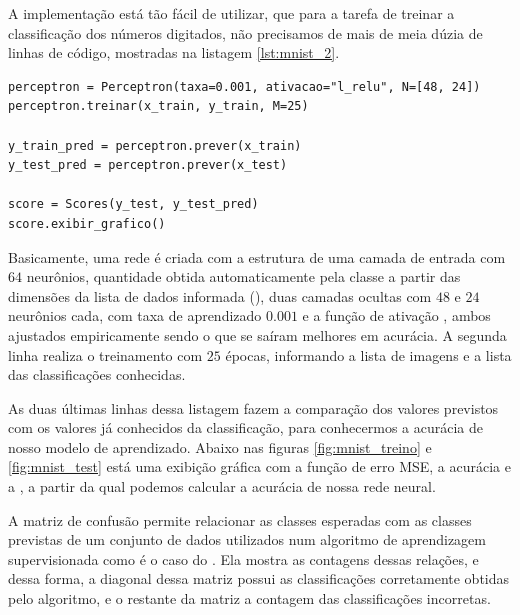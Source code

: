 A implementação está tão fácil de utilizar, que para a tarefa de treinar a classificação dos números digitados, não precisamos de mais de meia dúzia de linhas de código, mostradas na listagem \ref{lst:mnist_2}.

\begin{scriptsize}
\estiloR
\begin{lstlisting}[caption={Trecho do script \eng{mnist\_test.py}}, label={lst:mnist_2}, escapeinside={\%}]
perceptron = Perceptron(taxa=0.001, ativacao="l_relu", N=[48, 24])
perceptron.treinar(x_train, y_train, M=25)

y_train_pred = perceptron.prever(x_train)
y_test_pred = perceptron.prever(x_test)

score = Scores(y_test, y_test_pred)
score.exibir_grafico()
\end{lstlisting}
\end{scriptsize}

Basicamente, uma rede é criada com a estrutura de uma camada de entrada com $64$ neurônios, quantidade obtida automaticamente pela classe a partir das dimensões da lista de dados informada (), duas camadas ocultas com $48$ e $24$ neurônios cada, com taxa de aprendizado $0.001$ e a função de ativação , ambos ajustados empiricamente sendo o que se saíram melhores em acurácia. A segunda linha realiza o treinamento com $25$ épocas, informando a lista de imagens e a lista das classificações conhecidas.

As duas últimas linhas dessa listagem fazem a comparação dos valores previstos com os valores já conhecidos da classificação, para conhecermos a acurácia de nosso modelo de aprendizado. Abaixo nas figuras \ref{fig:mnist_treino} e \ref{fig:mnist_test} está uma exibição gráfica com a função de erro MSE, a acurácia e a , a partir da qual podemos calcular a acurácia de nossa rede neural.

A matriz de confusão permite relacionar as classes esperadas com as classes previstas de um conjunto de dados utilizados num algoritmo de aprendizagem supervisionada como é o caso do . Ela mostra as contagens dessas relações, e dessa forma, a diagonal dessa matriz possui as classificações corretamente obtidas pelo algoritmo, e o restante da matriz a contagem das classificações incorretas.

